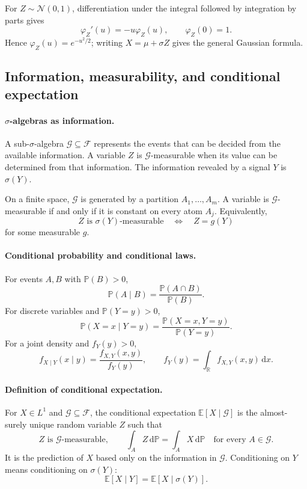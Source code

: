 \documentclass[11pt]{article}
\newcommand{\R}{\mathbb{R}}
\newcommand{\F}{\mathcal{F}}
\newcommand{\Pbb}{\mathbb{P}}
\newcommand{\E}{\mathbb{E}}
\newcommand{\dd}{\,\mathrm{d}}
\newcommand{\1}{\mathbf{1}}
\theoremstyle{plain}
\theoremstyle{definition}
\theoremstyle{remark}
\begin{document}
For $Z\sim\mathcal N(0,1)$, differentiation under the integral followed by
integration by parts gives
\[
\varphi_Z'(u)=-u\varphi_Z(u),
\qquad
\varphi_Z(0)=1.
\]
Hence $\varphi_Z(u)=e^{-u^2/2}$; writing $X=\mu+\sigma Z$ gives the general
Gaussian formula.

\subsection{Information, measurability, and conditional expectation}

\paragraph{$\sigma$-algebras as information.}
A sub-$\sigma$-algebra $\mathcal G\subseteq\F$ represents the events that
can be decided from the available information. A variable $Z$ is
$\mathcal G$-measurable when its value can be determined from that
information. The information revealed by a signal $Y$ is $\sigma(Y)$.

On a finite space, $\mathcal G$ is generated by a partition
$A_1,\ldots,A_m$. A variable is $\mathcal G$-measurable if and only if it is
constant on every atom $A_j$. Equivalently,
\[
Z\text{ is }\sigma(Y)\text{-measurable}
\quad\Longleftrightarrow\quad
Z=g(Y)
\]
for some measurable $g$.

\paragraph{Conditional probability and conditional laws.}
For events $A,B$ with $\Pbb(B)>0$,
\[
\Pbb(A\mid B)=\frac{\Pbb(A\cap B)}{\Pbb(B)}.
\]
For discrete variables and $\Pbb(Y=y)>0$,
\[
\Pbb(X=x\mid Y=y)
=\frac{\Pbb(X=x,Y=y)}{\Pbb(Y=y)}.
\]
For a joint density and $f_Y(y)>0$,
\[
f_{X\mid Y}(x\mid y)
=\frac{f_{X,Y}(x,y)}{f_Y(y)},
\qquad
f_Y(y)=\int_{\R}f_{X,Y}(x,y)\dd x.
\]

\paragraph{Definition of conditional expectation.}
For $X\in L^1$ and $\mathcal G\subseteq\F$, the conditional expectation
$\E[X\mid\mathcal G]$ is the almost-surely unique random variable $Z$ such
that
\[
Z\text{ is }\mathcal G\text{-measurable},
\qquad
\int_AZ\dd\Pbb=\int_AX\dd\Pbb
\quad\text{for every }A\in\mathcal G.
\]
It is the prediction of $X$ based only on the information in $\mathcal G$.
Conditioning on $Y$ means conditioning on $\sigma(Y)$:
\[
\E[X\mid Y]=\E[X\mid\sigma(Y)].
\]
\end{document}
